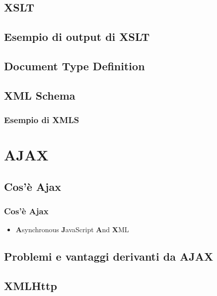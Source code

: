 \documentclass{beamer}
\begin{document}
\subsection{XSLT}
\subsection{Esempio di output di XSLT}
\subsection{Document Type Definition}
\subsection{XML Schema}
\subsubsection{Esempio di XMLS}

\section{AJAX}
\subsection{Cos'è Ajax}

\begin{frame}
    \frametitle{Cos'è Ajax}
    \begin{itemize}
    \item \textbf{A}synchronous \textbf{J}avaScript \textbf{A}nd \textbf{X}ML
    \end{itemize}

\end{frame}

\subsection{Problemi e vantaggi derivanti da AJAX}
\subsection{XMLHttp} 
\end{document}
